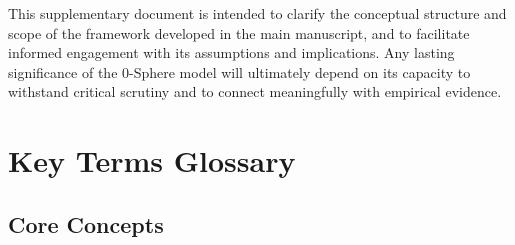 \documentclass[12pt,letterpaper]{article}
\begin{document}
This supplementary document is intended to clarify the conceptual structure and scope of the framework developed in the main manuscript, and to facilitate informed engagement with its assumptions and implications. Any lasting significance of the 0-Sphere model will ultimately depend on its capacity to withstand critical scrutiny and to connect meaningfully with empirical evidence.




\section*{Key Terms Glossary}

\subsection*{Core Concepts}
\end{document}
